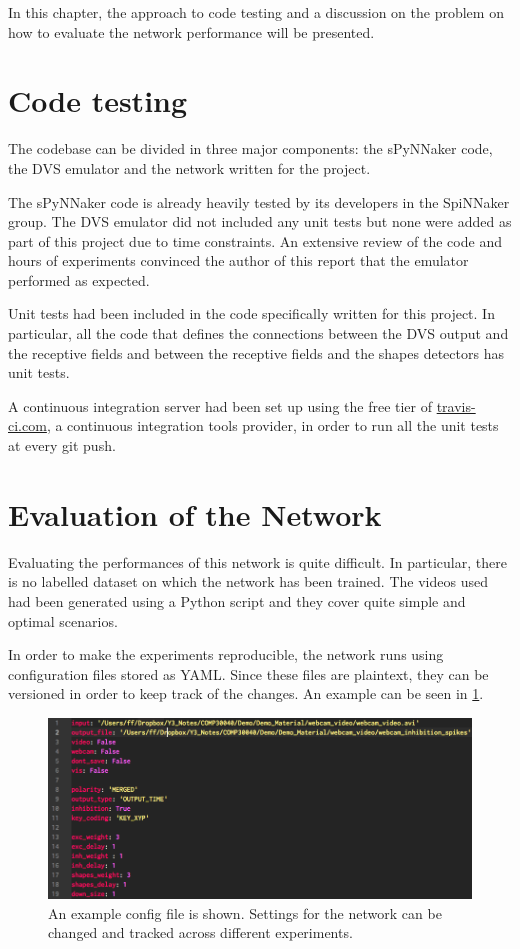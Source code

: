 In this chapter, the approach to code testing and a discussion on the problem on how to evaluate the network performance will be presented.


\section{Code testing}
The codebase can be divided in three major components: the sPyNNaker code, the DVS emulator and the network written for the project. 

The sPyNNaker code is already heavily tested by its developers in the SpiNNaker group. The DVS emulator did not included any unit tests but none were added as part of this project due to time constraints. An extensive review of the code and hours of experiments convinced the author of this report that the emulator performed as expected.

Unit tests had been included in the code specifically written for this project. In particular, all the code that defines the connections between the DVS output and the receptive fields and between the receptive fields and the shapes detectors has unit tests. 

A continuous integration server had been set up using the free tier of \href{http://travis-ci.com}{travis-ci.com}, a continuous integration tools provider, in order to run all the unit tests at every git push. 


\section{Evaluation of the Network}
Evaluating the performances of this network is quite difficult. In particular, there is no labelled dataset on which the network has been trained. 
The videos used had been generated using a Python script and they cover quite simple and optimal scenarios. 

In order to make the experiments reproducible, the network runs using configuration files stored as YAML. Since these files are plaintext, they can be versioned in order to keep track of the changes. An example can be seen in \cref{fig:config_file}. 

\begin{figure}[ht]
\centering
\includegraphics[width=\textwidth]{images/evaluation/config_file.png}
\caption[Config File for the Network]{An example config file is shown. Settings for the network can be changed and tracked across different experiments.}
\label{fig:config_file}
\end{figure}

